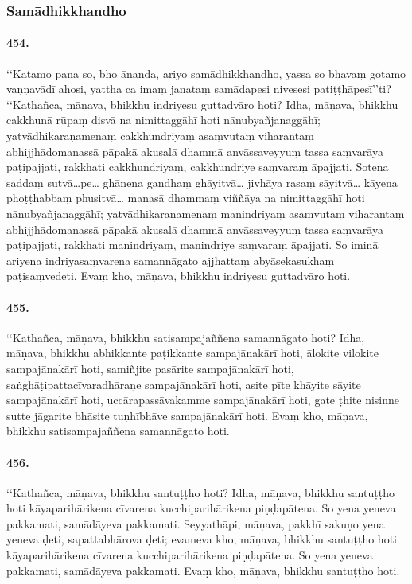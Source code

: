 \subsubsection{Samādhikkhandho}

\paragraph{454.} ‘‘Katamo pana so, bho ānanda, ariyo samādhikkhandho, yassa so bhavaṃ gotamo vaṇṇavādī ahosi, yattha ca imaṃ janataṃ samādapesi nivesesi patiṭṭhāpesī’’ti? ‘‘Kathañca, māṇava, bhikkhu indriyesu guttadvāro hoti? Idha, māṇava, bhikkhu cakkhunā rūpaṃ disvā na nimittaggāhī hoti nānubyañjanaggāhī; yatvādhikaraṇamenaṃ cakkhundriyaṃ asaṃvutaṃ viharantaṃ abhijjhādomanassā pāpakā akusalā dhammā anvāssaveyyuṃ tassa saṃvarāya paṭipajjati, rakkhati cakkhundriyaṃ, cakkhundriye saṃvaraṃ āpajjati. Sotena saddaṃ sutvā…pe… ghānena gandhaṃ ghāyitvā… jivhāya rasaṃ sāyitvā… kāyena phoṭṭhabbaṃ phusitvā… manasā dhammaṃ viññāya na nimittaggāhī hoti nānubyañjanaggāhī; yatvādhikaraṇamenaṃ manindriyaṃ asaṃvutaṃ viharantaṃ abhijjhādomanassā pāpakā akusalā dhammā anvāssaveyyuṃ tassa saṃvarāya paṭipajjati, rakkhati manindriyaṃ, manindriye saṃvaraṃ āpajjati. So iminā ariyena indriyasaṃvarena samannāgato ajjhattaṃ abyāsekasukhaṃ paṭisaṃvedeti. Evaṃ kho, māṇava, bhikkhu indriyesu guttadvāro hoti.

\paragraph{455.} ‘‘Kathañca, māṇava, bhikkhu satisampajaññena samannāgato hoti? Idha, māṇava, bhikkhu abhikkante paṭikkante sampajānakārī hoti, ālokite vilokite sampajānakārī hoti, samiñjite pasārite sampajānakārī hoti, saṅghāṭipattacīvaradhāraṇe sampajānakārī hoti, asite pīte khāyite sāyite sampajānakārī hoti, uccārapassāvakamme sampajānakārī hoti, gate ṭhite nisinne sutte jāgarite bhāsite tuṇhībhāve sampajānakārī hoti. Evaṃ kho, māṇava, bhikkhu satisampajaññena samannāgato hoti.

\paragraph{456.} ‘‘Kathañca, māṇava, bhikkhu santuṭṭho hoti? Idha, māṇava, bhikkhu santuṭṭho hoti kāyaparihārikena cīvarena kucchiparihārikena piṇḍapātena. So yena yeneva pakkamati, samādāyeva pakkamati. Seyyathāpi, māṇava, pakkhī sakuṇo yena yeneva ḍeti, sapattabhārova ḍeti; evameva kho, māṇava, bhikkhu santuṭṭho hoti kāyaparihārikena cīvarena kucchiparihārikena piṇḍapātena. So yena yeneva pakkamati, samādāyeva pakkamati. Evaṃ kho, māṇava, bhikkhu santuṭṭho hoti.

